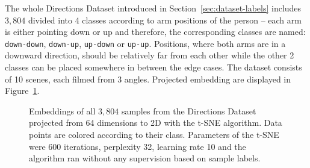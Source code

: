 The whole Directions Dataset introduced in Section~\ref{sec:dataset-labels} includes $3{,}804$ divided into 4 classes according to arm positions of the person -- each arm is either pointing down or up and therefore, the corresponding classes are named: \texttt{down-down}, \texttt{down-up}, \texttt{up-down} or \texttt{up-up}. Positions, where both arms are in a downward direction, should be relatively far from each other while the other 2 classes can be placed somewhere in between the edge cases. The dataset consists of 10 scenes, each filmed from 3 angles. Projected embedding are displayed in Figure~\ref{fig:t-sne}.

\begin{figure}[!ht]
    \centering
    \caption{Embeddings of all $3{,}804$ samples from the Directions Dataset projected from 64 dimensions to 2D with the t-SNE algorithm. Data points are colored according to their class. Parameters of the t-SNE were 600 iterations, perplexity 32, learning rate 10 and the algorithm ran without any supervision based on sample labels.}
    \label{fig:t-sne}
\end{figure}

